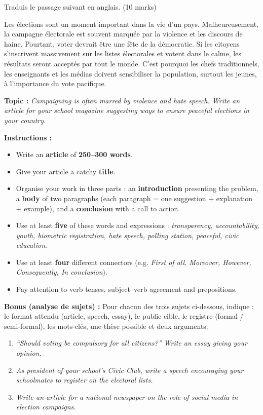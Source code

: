 \documentclass[11pt]{article}
\begin{document}
\begin{exercice}
Traduis le passage suivant en anglais. (10 marks)

\begin{textebox}
Les élections sont un moment important dans la vie d'un pays. Malheureusement, la campagne électorale est souvent marquée par la violence et les discours de haine. Pourtant, voter devrait être une fête de la démocratie. Si les citoyens s'inscrivent massivement sur les listes électorales et votent dans le calme, les résultats seront acceptés par tout le monde. C'est pourquoi les chefs traditionnels, les enseignants et les médias doivent sensibiliser la population, surtout les jeunes, à l'importance du vote pacifique.
\end{textebox}
\end{exercice}

\begin{exercice}
\textbf{Topic :} \emph{Campaigning is often marred by violence and hate speech. Write an article for your school magazine suggesting ways to ensure peaceful elections in your country.}

\textbf{Instructions :}
\begin{itemize}
\item Write an \textbf{article} of \textbf{250--300 words}.
\item Give your article a catchy \textbf{title}.
\item Organise your work in three parts : an \textbf{introduction} presenting the problem, a \textbf{body} of two paragraphs (each paragraph = one suggestion + explanation + example), and a \textbf{conclusion} with a call to action.
\item Use at least \textbf{five} of these words and expressions : \emph{transparency, accountability, youth, biometric registration, hate speech, polling station, peaceful, civic education}.
\item Use at least \textbf{four} different connectors (e.g. \emph{First of all, Moreover, However, Consequently, In conclusion}).
\item Pay attention to verb tenses, subject--verb agreement and prepositions.
\end{itemize}

\textbf{Bonus (analyse de sujets) :} Pour chacun des trois sujets ci-dessous, indique : le format attendu (article, speech, essay), le public cible, le registre (formal / semi-formal), les mots-clés, une thèse possible et deux arguments.
\begin{enumerate}
\item \emph{“Should voting be compulsory for all citizens?” Write an essay giving your opinion.}
\item \emph{As president of your school's Civic Club, write a speech encouraging your schoolmates to register on the electoral lists.}
\item \emph{Write an article for a national newspaper on the role of social media in election campaigns.}
\end{enumerate}
\end{exercice}
\end{document}
